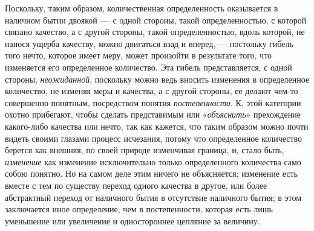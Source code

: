 Поскольку, таким образом, количественная определенность оказывается в
наличном бытии двоякой —~с одной стороны, такой определенностью, с которой
связано качество, а с другой стороны, такой определенностью, вдоль которой,
не нанося ущерба качеству, можно двигаться взад и вперед, — постольку
гибель того нечто, которое имеет меру, может произойти в результате того,
что изменяется его определенное количество. Эта гибель представляется, с
одной стороны, {\em неожиданной}, поскольку можно ведь
вносить изменения в определенное количество, не изменяя меры и качества, а
с другой стороны, ее делают чем-то совершенно понятным, посредством понятия
{\em постепенности}. К, этой категории охотно
прибегают, чтобы сделать представимым или
«{\em объяснить}» прехождение какого-либо качества или
нечто, так как кажется, что таким образом можно почти видеть своими глазами
процесс исчезания, потому что определенное количество берется как внешняя,
по своей природе изменчивая граница, и, стало быть,
{\em изменение} как изменение исключительно только
определенного количества само собою понятно. Но на самом деле этим ничего
не объясняется; изменение есть вместе с тем по существу переход одного
качества в другое, или более абстрактный переход от наличного бытия в
отсутствие наличного бытия; в этом заключается иное определение, чем в
постепенности, которая есть лишь уменьшение или увеличение и одностороннее
цепляние за величину.


